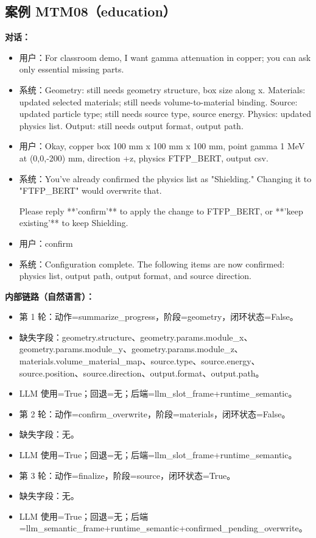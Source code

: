 \documentclass[11pt]{ctexart}
\begin{document}
\subsection{案例 MTM08（education）}
\textbf{对话：}
\begin{itemize}
\item 用户：For classroom demo, I want gamma attenuation in copper; you can ask only essential missing parts.
\item 系统：Geometry: still needs geometry structure, box size along x. Materials: updated selected materials; still needs volume-to-material binding. Source: updated particle type; still needs source type, source energy. Physics: updated physics list. Output: still needs output format, output path.
\item 用户：Okay, copper box 100 mm x 100 mm x 100 mm, point gamma 1 MeV at (0,0,-200) mm, direction +z, physics FTFP\_BERT, output csv.
\item 系统：You've already confirmed the physics list as "Shielding." Changing it to "FTFP\_BERT" would overwrite that.

Please reply **'confirm'** to apply the change to FTFP\_BERT, or **'keep existing'** to keep Shielding.
\item 用户：confirm
\item 系统：Configuration complete. The following items are now confirmed: physics list, output path, output format, and source direction.
\end{itemize}
\textbf{内部链路（自然语言）：}
\begin{itemize}
\item 第 1 轮：动作=summarize\_progress，阶段=geometry，闭环状态=False。
\item 缺失字段：geometry.structure、geometry.params.module\_x、geometry.params.module\_y、geometry.params.module\_z、materials.volume\_material\_map、source.type、source.energy、source.position、source.direction、output.format、output.path。
\item LLM 使用=True；回退=无；后端=llm\_slot\_frame+runtime\_semantic。
\item 第 2 轮：动作=confirm\_overwrite，阶段=materials，闭环状态=False。
\item 缺失字段：无。
\item LLM 使用=True；回退=无；后端=llm\_slot\_frame+runtime\_semantic。
\item 第 3 轮：动作=finalize，阶段=source，闭环状态=True。
\item 缺失字段：无。
\item LLM 使用=True；回退=无；后端=llm\_semantic\_frame+runtime\_semantic+confirmed\_pending\_overwrite。
\end{itemize}
\end{document}
